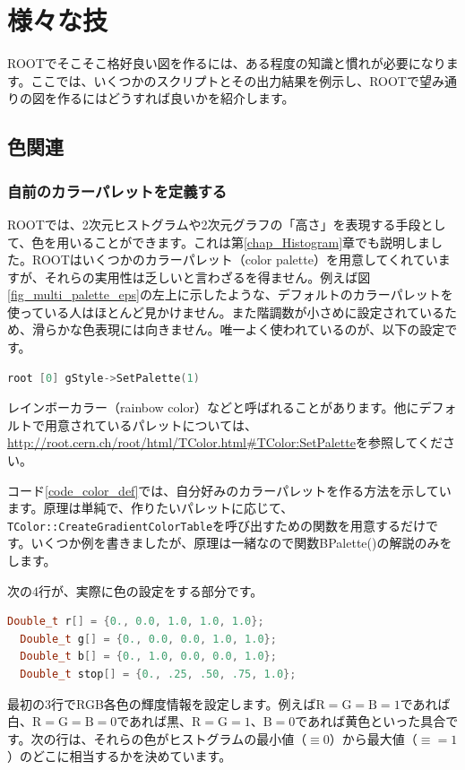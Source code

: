 \chapter{様々な技}

ROOTでそこそこ格好良い図を作るには、ある程度の知識と慣れが必要になります。ここでは、いくつかのスクリプトとその出力結果を例示し、ROOTで望み通りの図を作るにはどうすれば良いかを紹介します。

\section{色関連}
\subsection{自前のカラーパレットを定義する}

ROOTでは、2次元ヒストグラムや2次元グラフの「高さ」を表現する手段として、色を用いることができます。これは第\ref{chap_Histogram}章でも説明しました。ROOTはいくつかのカラーパレット（color palette）を用意してくれていますが、それらの実用性は乏しいと言わざるを得ません。例えば図\ref{fig_multi_palette_eps}の左上に示したような、デフォルトのカラーパレットを使っている人はほとんど見かけません。また階調数が小さめに設定されているため、滑らかな色表現には向きません。唯一よく使われているのが、以下の設定です。
\begin{lstlisting}[language=C++]
root [0] gStyle->SetPalette(1)
\end{lstlisting}
レインボーカラー（rainbow color）などと呼ばれることがあります。他にデフォルトで用意されているパレットについては、\url{http://root.cern.ch/root/html/TColor.html#TColor:SetPalette}を参照してください。

コード\ref{code_color_def}では、自分好みのカラーパレットを作る方法を示しています。原理は単純で、作りたいパレットに応じて、\texttt{TColor::CreateGradientColorTable}を呼び出すための関数を用意するだけです。いくつか例を書きましたが、原理は一緒なので関数BPalette()の解説のみをします。

\begin{NoFloat}

\end{NoFloat}

次の4行が、実際に色の設定をする部分です。
\begin{lstlisting}[language=c++]
  Double_t r[] = {0., 0.0, 1.0, 1.0, 1.0}; 
  Double_t g[] = {0., 0.0, 0.0, 1.0, 1.0}; 
  Double_t b[] = {0., 1.0, 0.0, 0.0, 1.0}; 
  Double_t stop[] = {0., .25, .50, .75, 1.0}; 
\end{lstlisting}
最初の3行でRGB各色の輝度情報を設定します。例えば$\mathrm{R}=\mathrm{G}=\mathrm{B}=1$であれば白、$\mathrm{R}=\mathrm{G}=\mathrm{B}=0$であれば黒、$\mathrm{R}=\mathrm{G}=1$、$\mathrm{B}=0$であれば黄色といった具合です。次の行は、それらの色がヒストグラムの最小値（$\equiv0$）から最大値（$\equiv=1$）のどこに相当するかを決めています。

